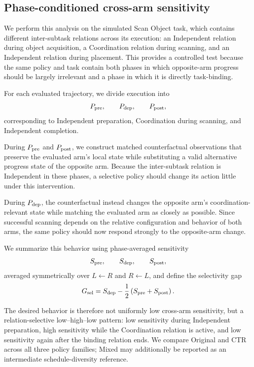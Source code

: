 \documentclass{article}
\newcommand{\method}{CTR}
\begin{document}
\subsection{Phase-conditioned cross-arm sensitivity}
We perform this analysis on the simulated Scan Object task, which contains different inter-subtask relations across its execution: an Independent relation during object acquisition, a Coordination relation during scanning, and an Independent relation during placement. This provides a controlled test because the same policy and task contain both phases in which opposite-arm progress should be largely irrelevant and a phase in which it is directly task-binding.

For each evaluated trajectory, we divide execution into
\begin{equation}
 P_{\rm pre},\qquad P_{\rm dep},\qquad P_{\rm post},
\end{equation}
corresponding to Independent preparation, Coordination during scanning, and Independent completion.

During $P_{\rm pre}$ and $P_{\rm post}$, we construct matched counterfactual observations that preserve the evaluated arm's local state while substituting a valid alternative progress state of the opposite arm. Because the inter-subtask relation is Independent in these phases, a selective policy should change its action little under this intervention.

During $P_{\rm dep}$, the counterfactual instead changes the opposite arm's coordination-relevant state while matching the evaluated arm as closely as possible. Since successful scanning depends on the relative configuration and behavior of both arms, the same policy should now respond strongly to the opposite-arm change.

We summarize this behavior using phase-averaged sensitivity
\begin{equation}
 S_{\rm pre},\qquad S_{\rm dep},\qquad S_{\rm post},
\end{equation}
averaged symmetrically over $L\leftarrow R$ and $R\leftarrow L$, and define the selectivity gap
\begin{equation}
 G_{\rm sel}=S_{\rm dep}-\frac{1}{2}\left(S_{\rm pre}+S_{\rm post}\right).
 \label{eq:selectivity_gap}
\end{equation}

The desired behavior is therefore not uniformly low cross-arm sensitivity, but a relation-selective low--high--low pattern: low sensitivity during Independent preparation, high sensitivity while the Coordination relation is active, and low sensitivity again after the binding relation ends. We compare Original and \method{} across all three policy families; Mixed may additionally be reported as an intermediate schedule-diversity reference.
\end{document}
